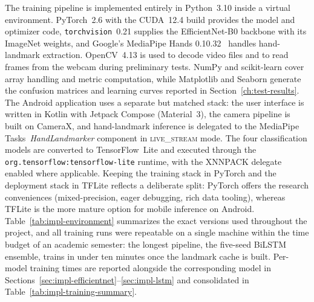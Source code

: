 The training pipeline is implemented entirely in Python~3.10 inside a
virtual environment. PyTorch~2.6 with the CUDA~12.4 build provides the
model and optimizer code, \texttt{torchvision}~0.21 supplies the
EfficientNet-B0 backbone with its ImageNet weights, and Google's
MediaPipe Hands 0.10.32~\cite{zhang2020mediapipe} handles hand-landmark
extraction. OpenCV~4.13 is used to decode video files and to read
frames from the webcam during preliminary tests. NumPy and
scikit-learn cover array handling and metric computation, while
Matplotlib and Seaborn generate the confusion matrices and learning
curves reported in Section~\ref{ch:test-results}. The Android
application uses a separate but matched stack: the user interface is
written in Kotlin with Jetpack Compose (Material~3), the camera
pipeline is built on CameraX, and hand-landmark inference is delegated
to the MediaPipe Tasks~\textit{HandLandmarker} component in
\textsc{live\_stream} mode. The four classification models are
converted to TensorFlow~Lite and executed through the
\texttt{org.tensorflow:\allowbreak tensorflow-lite} runtime, with the XNNPACK
delegate enabled where applicable. Keeping the training stack in
PyTorch and the deployment stack in TFLite reflects a deliberate
split: PyTorch offers the research conveniences (mixed-precision,
eager debugging, rich data tooling), whereas TFLite is the more mature
option for mobile inference on Android.
Table~\ref{tab:impl-environment} summarizes the exact versions used
throughout the project, and all training runs were repeatable on a
single machine within the time budget of an academic semester: the
longest pipeline, the five-seed BiLSTM ensemble, trains in under ten
minutes once the landmark cache is built. Per-model training times
are reported alongside the corresponding model in
Sections~\ref{sec:impl-efficientnet}--\ref{sec:impl-lstm} and
consolidated in Table~\ref{tab:impl-training-summary}.

